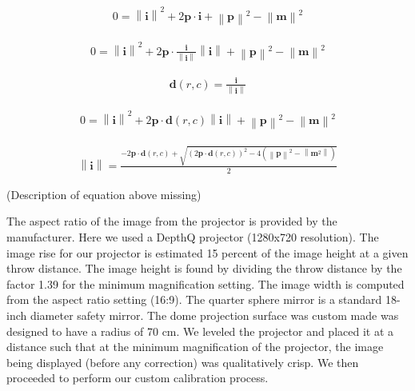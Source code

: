 \documentclass[10pt,letterpaper]{article}
\newcommand{\norm}[1]{\left\lVert#1\right\rVert}
\renewcommand{\vector}[1]{\mathbf{#1}}
\begin{document}
\begin{eqnarray}
\label{eq:lawofcosines3}
  0  = \norm{\vector{i}}^2 + 2\vector{p} \cdot \vector{i}  
  + \norm{\vector{p}}^2 -\norm{\vector{m}}^2
\end{eqnarray}

\begin{eqnarray}
\label{eq:quadratic}
  0  = \norm{\vector{i}}^2 + 2\vector{p} \cdot
  \frac{\vector{i}}{\norm{\vector{i}}} \norm{\vector{i}}
  + \norm{\vector{p}}^2 -\norm{\vector{m}}^2
\end{eqnarray}

\begin{eqnarray}
\label{eq:1}
  \vector{d}(r,c) = \frac{\vector{i}}{\norm{\vector{i}}}
\end{eqnarray}

\begin{eqnarray}
\label{eq:quadratic2}
  0  = \norm{\vector{i}}^2 + 2\vector{p} \cdot
  \vector{d}(r,c) \norm{\vector{i}}
  + \norm{\vector{p}}^2 -\norm{\vector{m}}^2
\end{eqnarray}

\begin{eqnarray}
\label{eq:quadraticsoln}
  \norm{\vector{i}} = \frac{-2\vector{p} \cdot \vector{d}(r,c) + 
  \sqrt{(2\vector{p} \cdot \vector{d}(r,c))^2
  - 4(\norm{\vector{p}}^2 - \norm{\vector{m}^2})}}{2}
\end{eqnarray}






(Description of equation above missing)

The aspect ratio of the image from the projector is provided by the
manufacturer. Here we used a DepthQ projector (1280x720 resolution).  The image
rise for our projector is estimated 15 percent of the image height at a given
throw distance. The image height is found by dividing the throw distance by the
factor 1.39 for the minimum magnification setting. The image width is computed
from the aspect ratio setting (16:9). The quarter sphere mirror is a standard
18-inch diameter safety mirror. The dome projection surface was custom made was
designed to have a radius of 70 cm. We leveled the projector and placed it at a
distance such that at the minimum magnification of the projector, the image
being displayed (before any correction) was qualitatively crisp. We then
proceeded to perform our custom calibration process.
\end{document}
